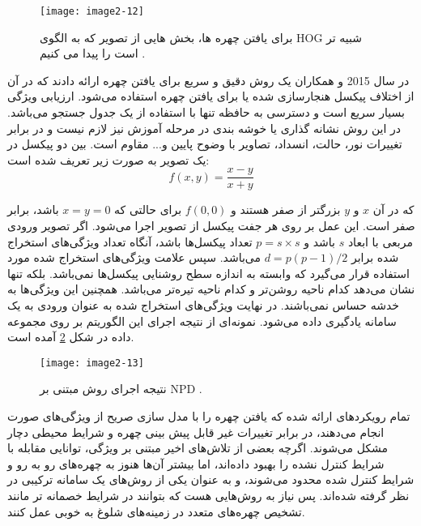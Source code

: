 \begin{figure}
	\centering
	\texttt{[image: image2-12]}
	\caption{براى یافتن چهره ها، بخش هایى از تصویر كه به الگوى HOG شبیه تر است را پیدا می كنیم \cite{1467360}.}
	\label{image2-12}
\end{figure}

\noindent
در سال 2015  و همکاران \cite{7130626} یک روش دقیق و سریع برای یافتن چهره ارائه دادند که در آن از اختلاف پیکسل هنجارسازی شده یا   برای یافتن چهره استفاده می‌شود. ارزیابی ویژگی  بسیار سریع است و دسترسی به حافظه تنها با استفاده از یک جدول جستجو می‌باشد. در این روش نشانه گذاری یا خوشه بندی در مرحله آموزش نیز لازم نیست و در برابر تغییرات نور، حالت، انسداد، تصاویر با وضوح پایین و... مقاوم است.  بین دو پیکسل در یک تصویر به صورت زیر تعریف شده است:
\begin{equation}\label{eq2-6}
f(x, y) = \frac{x - y}{x + y}
\end{equation}

\noindent
که در آن $x$ و $y$ بزرگتر از صفر هستند و $f(0,0)$ برای حالتی که $x = y = 0$ باشد، برابر صفر است. این عمل بر روی هر جفت پیکسل از تصویر اجرا می‌شود. اگر تصویر ورودی مربعی با ابعاد $s$ باشد و $p=s \times s$ تعداد پیکسل‌ها باشد، آنگاه تعداد ویژگی‌های استخراج شده برابر $d=p(p-1)/2$ می‌باشد. سپس علامت  ویژگی‌های استخراج شده مورد استفاده قرار می‌گیرد که وابسته به اندازه سطح روشنایی پیکسل‌ها نمی‌باشد. بلکه تنها نشان می‌دهد کدام ناحیه روشن‌تر و کدام ناحیه تیره‌تر می‌باشد. همچنین این ویژگی‌ها به خدشه  حساس نمی‌باشند. در نهایت ویژگی‌های استخراج شده به عنوان ورودی به یک سامانه یادگیری داده می‌شود. نمونه‌ای از نتیجه اجرای این الگوریتم بر روی مجموعه داده  در شکل \ref{image2-13} آمده است.
 
 \begin{figure}[h]
\centering
  \texttt{[image: image2-13]}
  \caption{نتیجه اجرای روش مبتنی بر NPD \cite{7130626}.}
  \label{image2-13}
\end{figure}

\noindent
تمام رویکرد‌های ارائه شده که یافتن چهره را با مدل سازی صریح از ویژگی‌های صورت انجام می‌دهند، در برابر تغییرات غیر قابل پیش بینی چهره و شرایط محیطی دچار مشکل می‌شوند. اگرچه بعضی از تلاش‌های اخیر مبتنی بر ویژگی، توانایی مقابله با شرایط کنترل نشده را بهبود داده‌اند، اما بیشتر آن‌ها هنوز به چهره‌های رو به رو و شرایط کنترل شده محدود می‌شوند، و به عنوان یکی از روش‌های یک سامانه ترکیبی در نظر گرفته شده‌اند. پس نیاز به روش‌هایی هست که بتوانند در شرایط خصمانه تر مانند تشخیص چهره‌های متعدد در زمینه‌های شلوغ به خوبی عمل کنند.

